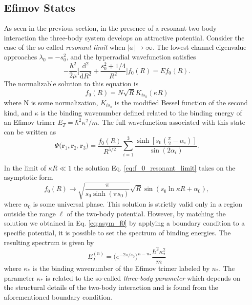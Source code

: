 \documentclass[prl,onecolumn,amsmath,amssymb,titlepage,nofootinbib,preprint]{revtex4-1}
\begin{document}
\subsection{Efimov States}

	As seen in the previous section, in the presence of a resonant two-body interaction the three-body system develops an attractive potential.  Consider the case of the so-called \textit{resonant limit} \cite{Braaten_2006} when $|a|\rightarrow \infty$.  The lowest channel eigenvalue approaches $\lambda_0=-s_0^2$, and the hyperradial wavefunction satisfies
	\begin{equation}
		-\frac{\hbar^{2}}{2\mu}\bigg[\frac{\mathrm{d}^{2}}{\mathrm{d}R^{2}}+\frac{s_0^2+1/4}{R^2}\bigg]f_0(R)=E f_0(R).
	\end{equation} 
	The normalizable solution to this equation is
		\begin{equation}\label{eq:f_0_resonant_limit}
			f_0(R)=N\sqrt{R}K_{is_0}(\kappa R)
		\end{equation}
	where N is some normalization, $K_{i s_{0}}$ is the modified Bessel function of the second kind, and $\kappa$ is the binding wavenumber defined related to the binding energy of an Efimov trimer $E_{T}=\hbar^{2}\kappa^{2}/m$.  The full wavefunction associated with this state can be written as
		\begin{equation}\label{eq:wavefunction_efimov_trimer}
			\Psi\big(\mathbf{r}_1,\mathbf{r}_2,\mathbf{r}_3\big)=\frac{f_{0}(R)}{R^{5/2}}\sum_{i=1}^{3}\frac{\sinh[s_0(\frac{\pi}{2}-\alpha_{i})]}{\sin(2\alpha_{i})}.
		\end{equation}

	In the limit of $\kappa R\ll 1$ the solution Eq. \ref{eq:f_0_resonant_limit} takes on the asymptotic form
		\begin{equation}\label{eq:asym_f0}
			f_0(R)\rightarrow \sqrt{\frac{\pi}{s_0 \sinh(\pi s_0)}}\sqrt{R}\sin(s_0\ln\kappa R+\alpha_0),
		\end{equation}
	where $\alpha_0$ is some universal phase.  This solution is strictly valid only in a region outside the range $\ell$ of the two-body potential.  However, by matching the solution we obtained in Eq. \ref{eq:asym_f0} by applying a boundary condition to a specific potential, it is possible to set the spectrum of binding energies.  The resulting spectrum is given by \cite{Efimov1970}\cite{Braaten_2006}
		\begin{equation}\label{eq:Efimov_trimer_binding_E}
			E_{T}^{(n)}=\big(e^{-2\pi/s_0}\big)^{n-n_{*}}\frac{\hbar^{2}\kappa_{*}^{2}}{m}
		\end{equation}
	where $\kappa_{*}$ is the binding wavenumber of the Efimov trimer labeled by $n_{*}$.  The parameter $\kappa_{*}$ is related to the so-called \textit{three-body parameter} which depends on the structural details of the two-body interaction and is found from the aforementioned boundary condition.
	
\end{document}

